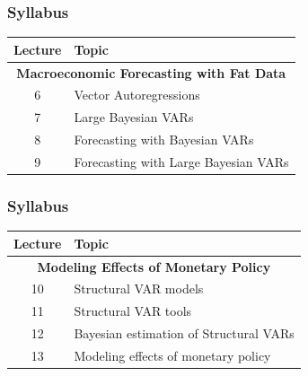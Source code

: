 \documentclass[notes,blackandwhite,mathsans]{beamer}
\begin{document}
\begin{frame}
\frametitle{Syllabus}

\begin{center}
\begin{tabular}{ c l}
\toprule 
Lecture & Topic \\
\midrule
\multicolumn{2}{c}{\textbf{Macroeconomic Forecasting with Fat Data}}\\
6  & Vector Autoregressions \\
7  & {\color{mcxs2}Large Bayesian VARs} \\
8  & {\color{mcxs2}Forecasting with Bayesian VARs} \\
9  & {\color{mcxs2}Forecasting with Large Bayesian VARs} \\[1ex]
\bottomrule
\end{tabular}
\end{center}

\end{frame}


\begin{frame}
\frametitle{Syllabus}
\small
\begin{center}
\begin{tabular}{ c l}
\toprule 
Lecture & Topic \\
\midrule
\multicolumn{2}{c}{\textbf{Modeling Effects of Monetary Policy}}\\
10  & {\color{mcxs2}Structural VAR} models \\
11  & {\color{mcxs2}Structural VAR} tools \\
12  & {\color{mcxs2}Bayesian estimation  of Structural VARs} \\
13  & {\color{mcxs2}Modeling effects of monetary policy} \\[1ex]
\bottomrule
\end{tabular}
\end{center}

\end{frame}
\end{document}
